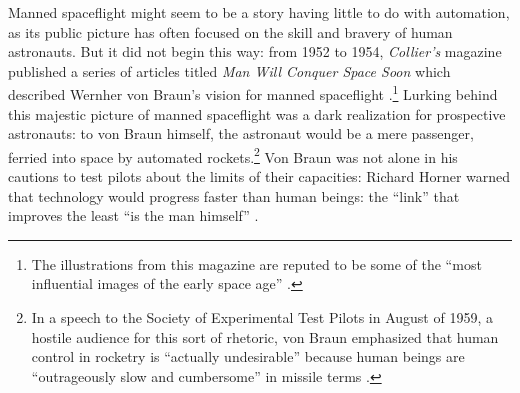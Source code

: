 Manned spaceflight might seem to be a story having little to do with
automation, as its public picture has often focused on the skill and
bravery of human astronauts. But it did not begin this way: from 1952
to 1954, \emph{Collier's} 
magazine published a series of articles 
titled \emph{Man Will Conquer Space Soon} which described Wernher von
Braun's vision for manned spaceflight \cite{scribdColliers}
\cite{dreamsofspace}.\footnote{The illustrations from this magazine
  are reputed to be some of the ``most influential images of the early
space age'' \cite[p. 9]{marketingMoon}.} Lurking behind this majestic
picture of manned spaceflight was a dark 
realization for prospective astronauts: to von Braun himself, the
astronaut would be a mere passenger, ferried into space by automated
rockets.\footnote{In a speech to the Society of Experimental Test Pilots in
August of 1959, a hostile audience for this sort of rhetoric, von
Braun emphasized that human control in rocketry is ``actually
undesirable'' because human beings are ``outrageously slow and
cumbersome'' in missile terms \cite[p. 66-67]{DM}.} Von Braun
was not alone in his cautions to
test pilots about the limits of their capacities: Richard Horner
warned that technology would progress
faster than human beings: the ``link'' that improves the least ``is
the man himself'' \cite[p. 19]{DM}. 



